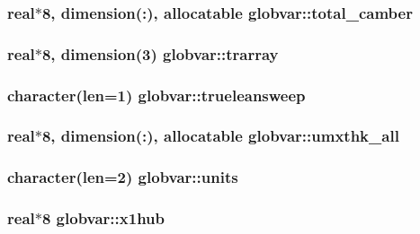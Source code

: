 \subsubsection[{total\+\_\+camber}]{\setlength{\rightskip}{0pt plus 5cm}real$\ast$8, dimension(\+:), allocatable globvar\+::total\+\_\+camber}\label{namespaceglobvar_a69a510c5294264ed214fd28b3eb2c837}
\hypertarget{namespaceglobvar_a0256e20cf8e4b736584fce52a2be89ad}{}
\subsubsection[{trarray}]{\setlength{\rightskip}{0pt plus 5cm}real$\ast$8, dimension(3) globvar\+::trarray}\label{namespaceglobvar_a0256e20cf8e4b736584fce52a2be89ad}
\hypertarget{namespaceglobvar_a113718364777f5700503cc4655ea8a36}{}
\subsubsection[{trueleansweep}]{\setlength{\rightskip}{0pt plus 5cm}character(len=1) globvar\+::trueleansweep}\label{namespaceglobvar_a113718364777f5700503cc4655ea8a36}
\hypertarget{namespaceglobvar_a1e3e80a1760c544775d54a22dc950fef}{}
\subsubsection[{umxthk\+\_\+all}]{\setlength{\rightskip}{0pt plus 5cm}real$\ast$8, dimension(\+:), allocatable globvar\+::umxthk\+\_\+all}\label{namespaceglobvar_a1e3e80a1760c544775d54a22dc950fef}
\hypertarget{namespaceglobvar_a5a48d5b0df94151f6ccff35f89d832ed}{}
\subsubsection[{units}]{\setlength{\rightskip}{0pt plus 5cm}character(len=2) globvar\+::units}\label{namespaceglobvar_a5a48d5b0df94151f6ccff35f89d832ed}
\hypertarget{namespaceglobvar_a97e3fd0f031b96c6a64f2b048bd344f6}{}
\subsubsection[{x1hub}]{\setlength{\rightskip}{0pt plus 5cm}real$\ast$8 globvar\+::x1hub}\label{namespaceglobvar_a97e3fd0f031b96c6a64f2b048bd344f6}
\hypertarget{namespaceglobvar_ae73d73414e05c7ff4485109025aebb8b}{}
